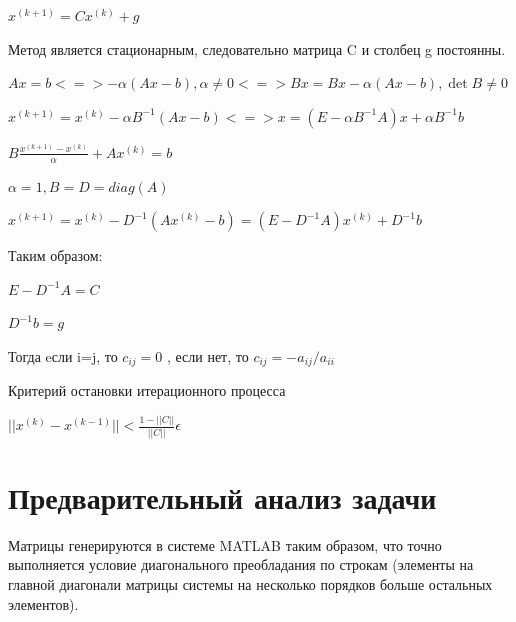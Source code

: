 \begin{math}
	x^{(k+1)}=Cx^{(k)}+g
\end{math}

Метод является стационарным, следовательно матрица C и столбец g постоянны.

\begin{math}
	Ax=b <=> -\alpha(Ax-b),\alpha\ne 0 <=> Bx=Bx-\alpha(Ax-b), \det{B}\ne 0
\end{math}

\begin{math}
	x^{(k+1)}=x^{(k)}-\alpha B^{-1}(Ax-b)<=>x=(E-\alpha B^{-1}A)x+\alpha B^{-1} b
\end{math}

\begin{math}
   B\frac{x^{(k+1)}-x^{(k)}}{\alpha}+Ax^{(k)}=b
\end{math}

\begin{math}
	\alpha=1,B=D=diag(A)
\end{math}

\begin{math}
		x^{(k+1)}=x^{(k)}-D^{-1}(Ax^{(k)}-b)=(E-D^{-1}A)x^{(k)}+D^{-1}b
\end{math}


Таким образом: 

\begin{math}
	E-D^{-1}A=C
\end{math}

\begin{math}
	D^{-1}b=g
\end{math}

Тогда eсли i=j, то 
\begin{math}
	c_{ij}=0
\end{math}
, если нет, то
\begin{math}
	c_{ij}=-a_{ij}/a_{ii}
\end{math}

Критерий остановки итерационного процесса 

\begin{math}
	||x^{(k)}-x^{(k-1)}||<\frac{1-||C||}{||C||}\epsilon
\end{math}


\section{Предварительный анализ задачи}

Матрицы генерируются в системе MATLAB таким образом, что точно выполняется условие диагонального преобладания по строкам (элементы на главной диагонали матрицы системы на несколько порядков больше остальных элементов).

